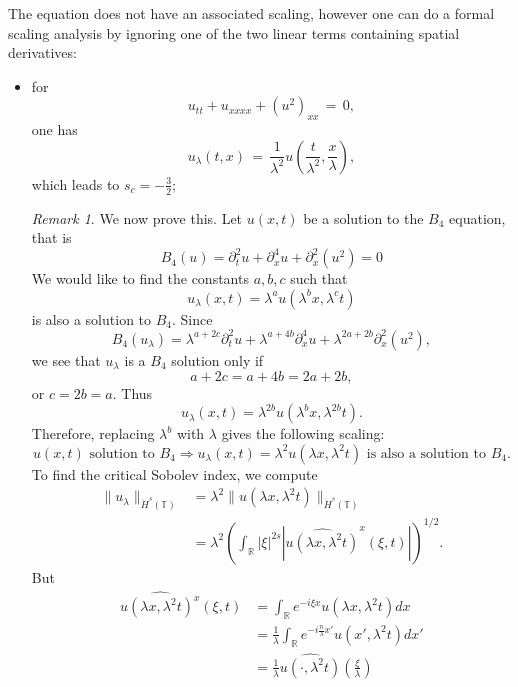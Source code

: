 \documentclass[12pt,reqno]{amsart}
\numberwithin{equation}{section}  %
\numberwithin{figure}{section}
\newcommand{\rr}{\mathbb{R}}
\newcommand{\ci}{\mathbb{T}}
\newcommand{\wh}{\widehat}
\theoremstyle{plain}
\theoremstyle{definition}
\theoremstyle{remark}
\newtheorem{remark}{Remark}
\begin{document}
The equation does not have an associated scaling, however one can do a formal scaling analysis by ignoring one of the two linear terms containing spatial derivatives:
\begin{itemize}
  \item for 
    \[
    u_{tt}+u_{xxxx}+(u^2)_{xx}\,=\,0,
    \]
    one has 
    \[
    u_{\lambda}(t,x)\,=\,\frac{1}{\lambda^2}u\left(\frac{t}{\lambda^2}, \frac{x}{\lambda}\right),
    \]
    which leads to $s_c=-\frac 32$;
\begin{framed}
\begin{remark}
We now prove this.
Let $u(x, t)$ be a solution to the $B_4$ equation, that is
%
$$
B_4(u)=
 \partial_t^2u + \partial^4_x u + \partial_x^2(u^2)  = 0
$$
%
We would like to find the constants
$a, b, c$ such that
\[
u_\lambda (x, t) = \lambda^a u(\lambda^b x, \lambda^c t)
\]
is also a solution to $B_4$.  Since 
$$
B_4(u_\lambda)=
\lambda^{a+2c} \partial_t^2u 
+
 \lambda^{a+4b} \partial^4_x u 
 +
  \lambda^{2a+2b}
  \partial_x^2(u^2),  
$$
we see that $u_\lambda$ is a $B_4$ solution only if
$$
a+2c=a+4b=2a+2b,
$$
or
$
c= 2b =a.
$
  Thus
\[
u_\lambda (x, t) = \lambda^{2b} u(\lambda^{b}x,  \lambda^{2b} t).
\]
%
%
Therefore, replacing  $ \lambda^b$ with  $ \lambda$ gives the following scaling:
%
\begin{equation}
\label{DP-scal}
\boxed{
u(x, t) \text{ solution to }  B_4
 \Longrightarrow 
u_\lambda (x, t) = \lambda^2 u(\lambda x, \lambda^2 t)  \text { is also a
solution to }  B_4. 
}
\end{equation}
\label{rem:scaling}
To find the critical Sobolev index, we compute
%
%
\begin{equation}
\begin{split}
  \| u_{\lambda} \|_{\dot{H}^s(\ci)} 
  & = \lambda^{2} \| u(\lambda x, \lambda^2 t) \|_{\dot{H}^{s}(\ci)}
  \\
  & = \lambda^{2} \left( \int_{\rr} | \xi |^{2s} | \wh{u (\lambda x,
  \lambda^{2} t)}^x (\xi, t)| \right)^{1/2}.
\end{split}
\label{crit-ind-comp}
\end{equation}
%
But
%
%
\begin{equation*}
\begin{split}
  \wh{u(\lambda x, \lambda^{2}t)^x}(\xi, t)
  & = \int_{\rr}e^{-i\xi x}u(\lambda x, \lambda^2 t) dx
  \\
  & = \frac{1}{\lambda} \int_{\rr}e^{-i \frac{n}{\lambda} x'}u(x',
  \lambda^{2} t) dx'
  \\
  & = \frac{1}{\lambda} \wh{u(\cdot, \lambda^{2}t)}(\frac{\xi}{\lambda})

\end{split}
\end{equation*}
\end{remark}
\end{framed}
\end{itemize}
\end{document}
